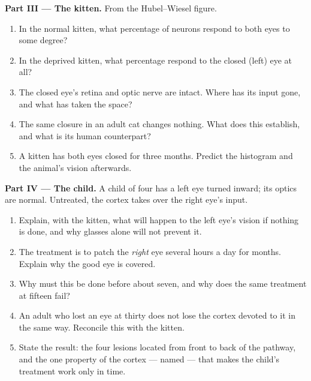 \begin{problem}
\medskip
\noindent\textbf{Part III --- The kitten.}
From the Hubel--Wiesel figure.
\begin{enumerate}[resume]
  \item In the normal kitten, what percentage of neurons respond to
        both eyes to some degree?
  \item In the deprived kitten, what percentage respond to the closed
        (left) eye at all?
  \item The closed eye's retina and optic nerve are intact. Where has
        its input gone, and what has taken the space?
  \item The same closure in an adult cat changes nothing. What does
        this establish, and what is its human counterpart?
  \item A kitten has both eyes closed for three months. Predict the
        histogram and the animal's vision afterwards.
\end{enumerate}

\medskip
\noindent\textbf{Part IV --- The child.}
A child of four has a left eye turned inward; its optics are normal.
Untreated, the cortex takes over the right eye's input.
\begin{enumerate}[resume]
  \item Explain, with the kitten, what will happen to the left eye's
        vision if nothing is done, and why glasses alone will not
        prevent it.
  \item The treatment is to patch the \emph{right} eye several hours a
        day for months. Explain why the good eye is covered.
  \item Why must this be done before about seven, and why does the
        same treatment at fifteen fail?
  \item An adult who lost an eye at thirty does not lose the cortex
        devoted to it in the same way. Reconcile this with the kitten.
  \item State the result: the four lesions located from front to back
        of the pathway, and the one property of the cortex --- named
        --- that makes the child's treatment work only in time.
\end{enumerate}
\end{problem}
